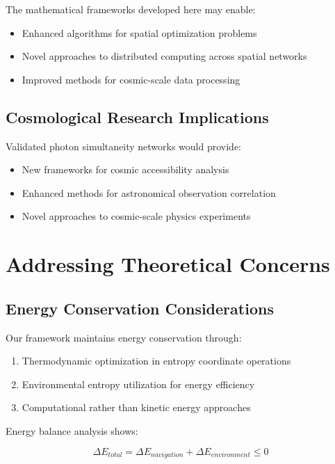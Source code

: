 \documentclass[12pt,a4paper]{article}
\begin{document}
The mathematical frameworks developed here may enable:

\begin{itemize}
\item Enhanced algorithms for spatial optimization problems
\item Novel approaches to distributed computing across spatial networks
\item Improved methods for cosmic-scale data processing
\end{itemize}

\subsection{Cosmological Research Implications}

Validated photon simultaneity networks would provide:

\begin{itemize}
\item New frameworks for cosmic accessibility analysis
\item Enhanced methods for astronomical observation correlation
\item Novel approaches to cosmic-scale physics experiments
\end{itemize}

\section{Addressing Theoretical Concerns}

\subsection{Energy Conservation Considerations}

Our framework maintains energy conservation through:

\begin{enumerate}
\item Thermodynamic optimization in entropy coordinate operations
\item Environmental entropy utilization for energy efficiency
\item Computational rather than kinetic energy approaches
\end{enumerate}

Energy balance analysis shows:

\begin{equation}
\Delta E_{total} = \Delta E_{navigation} + \Delta E_{environment} \leq 0
\label{eq:energy_balance}
\end{equation}
\end{document}

